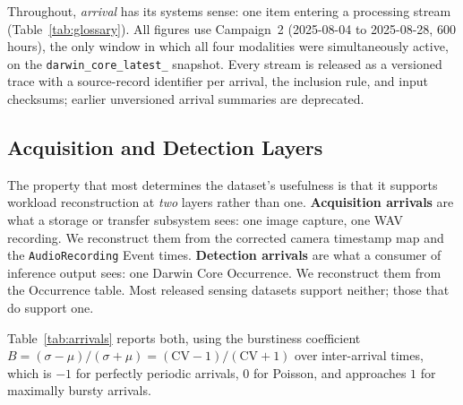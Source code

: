 \documentclass[sigconf]{acmart}
\begin{document}
Throughout, \emph{arrival} has its systems sense: one item entering a
processing stream (Table~\ref{tab:glossary}). All figures use Campaign~2
(2025-08-04 to 2025-08-28, 600 hours), the only window in which all four
modalities were simultaneously active, on the
\texttt{darwin\_core\_\allowbreak latest\_} snapshot. Every stream is released as a
versioned trace with a source-record identifier per arrival, the
inclusion rule, and input checksums; earlier unversioned arrival
summaries are deprecated.

\subsection{Acquisition and Detection Layers}

The property that most determines the dataset's usefulness is that it
supports workload reconstruction at \emph{two} layers rather than one.
\textbf{Acquisition arrivals} are what a storage or transfer subsystem
sees: one image capture, one WAV recording. We reconstruct them from the
corrected camera timestamp map and the \texttt{AudioRecording} Event
times. \textbf{Detection arrivals} are what a consumer of inference
output sees: one Darwin Core Occurrence. We reconstruct them from the
Occurrence table. Most released sensing datasets support neither; those
that do support one.

Table~\ref{tab:arrivals} reports both, using the burstiness coefficient
$B = (\sigma-\mu)/(\sigma+\mu) = (\mathrm{CV}-1)/(\mathrm{CV}+1)$ over
inter-arrival times, which is $-1$ for perfectly periodic arrivals, $0$
for Poisson, and approaches $1$ for maximally bursty arrivals.
\end{document}
